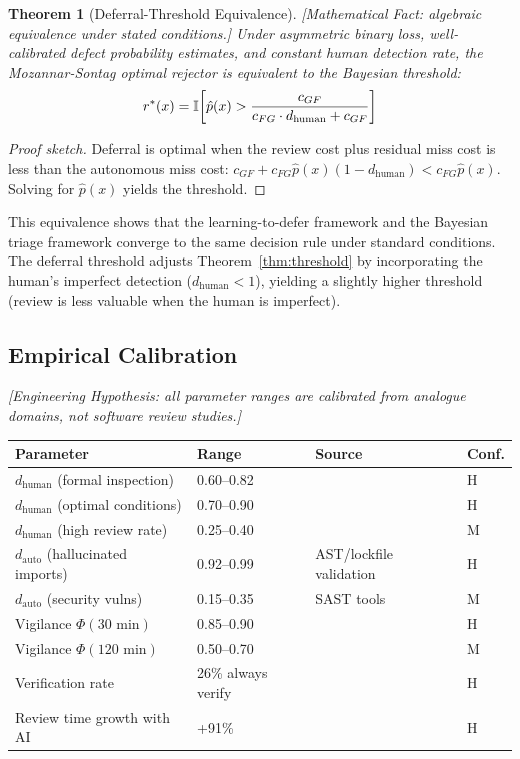 \documentclass[11pt, a4paper]{googledeepmind}
\newtheorem{theorem}{Theorem}[section]
\begin{document}
\begin{theorem}[Deferral-Threshold Equivalence]
\emph{[Mathematical Fact: algebraic equivalence under stated conditions.]}
\label{thm:deferral-equivalence}
Under asymmetric binary loss, well-calibrated defect probability estimates, and constant human detection rate, the Mozannar-Sontag optimal rejector is equivalent to the Bayesian threshold:
\begin{equation}
r^*(x) = \mathbb{I}\!\left[\hat{p}(x) > \frac{c_{GF}}{c_{FG} \cdot d_{\textup{human}} + c_{GF}}\right]
\end{equation}
\end{theorem}

\begin{proof}[Proof sketch]
Deferral is optimal when the review cost plus residual miss cost is less than the autonomous miss cost: $c_{GF} + c_{FG}\hat{p}(x)(1-d_{\text{human}}) < c_{FG}\hat{p}(x)$. Solving for $\hat{p}(x)$ yields the threshold.
\end{proof}

This equivalence shows that the learning-to-defer framework and the Bayesian triage framework converge to the same decision rule under standard conditions. The deferral threshold adjusts Theorem~\ref{thm:threshold} by incorporating the human's imperfect detection ($d_{\text{human}} < 1$), yielding a slightly higher threshold (review is less valuable when the human is imperfect).

\subsection{Empirical Calibration}

\emph{[Engineering Hypothesis: all parameter ranges are calibrated from analogue domains, not software review studies.]}

\begin{center}
\small
\begin{tabular}{llll}
\toprule
\textbf{Parameter} & \textbf{Range} & \textbf{Source} & \textbf{Conf.} \\
\midrule
$d_{\text{human}}$ (formal inspection) & 0.60--0.82 & \citet{fagan1976design, jones1996software} & H \\
$d_{\text{human}}$ (optimal conditions) & 0.70--0.90 & \citet{cohen2006best} & H \\
$d_{\text{human}}$ (high review rate) & 0.25--0.40 & \citet{cohen2006best} & M \\
$d_{\text{auto}}$ (hallucinated imports) & 0.92--0.99 & AST/lockfile validation & H \\
$d_{\text{auto}}$ (security vulns) & 0.15--0.35 & SAST tools & M \\
Vigilance $\Phi(30\text{ min})$ & 0.85--0.90 & \citet{mackworth1948breakdown} & H \\
Vigilance $\Phi(120\text{ min})$ & 0.50--0.70 & \citet{mackworth1948breakdown} & M \\
Verification rate & 26\% always verify & \citet{sonar2026} & H \\
Review time growth with AI & +91\% & \citet{dora2025} & H \\
\bottomrule
\end{tabular}
\end{center}
\end{document}
